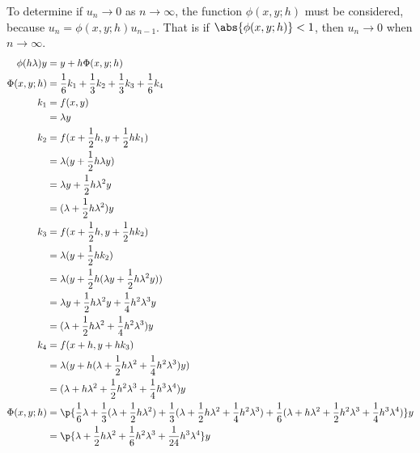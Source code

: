 \documentclass[11pt]{article}
\begin{document}
\begin{enumerate}
\begin{enumerate}
                To determine if $u_n \to 0$ as $n \to \infty$, the function $\phi(x,y;h)$
                must be considered, because $u_n = \phi(x,y;h) u_{n-1}$.
                That is if $\abs{\phi(x,y;h)} < 1$, then $u_n \to 0$ when
                $n \to \infty$.
                \begin{align*}
                    \phi(h\lambda)y &= y + h\Phi(x,y;h) \\
                    \Phi(x,y;h) &= \frac{1}{6} k_1 + \frac{1}{3}k_2 + \frac{1}{3}k_3 + \frac{1}{6}k_4 \\
                    k_1 &= f(x,y) \\
                        &= \lambda y \\
                    k_2 &= f(x + \frac{1}{2}h, y + \frac{1}{2}h k_1) \\
                        &= \lambda(y + \frac{1}{2}h \lambda y) \\
                        &= \lambda y + \frac{1}{2} h \lambda^2 y \\
                        &= (\lambda + \frac{1}{2} h \lambda^2) y \\
                    k_3 &= f(x + \frac{1}{2}h, y + \frac{1}{2} h k_2) \\
                        &= \lambda(y + \frac{1}{2} h k_2) \\
                        &= \lambda(y + \frac{1}{2} h (\lambda y + \frac{1}{2} h \lambda^2 y)) \\
                        &= \lambda y + \frac{1}{2} h \lambda^2 y + \frac{1}{4} h^2 \lambda^3 y \\
                        &= (\lambda + \frac{1}{2} h \lambda^2 + \frac{1}{4} h^2 \lambda^3) y \\
                    k_4 &= f(x + h, y + h k_3) \\
                        &= \lambda(y + h (\lambda + \frac{1}{2} h \lambda^2 + \frac{1}{4} h^2 \lambda^3) y) \\
                        &= (\lambda + h \lambda^2 + \frac{1}{2} h^2 \lambda^3 + \frac{1}{4} h^3 \lambda^4) y \\
                    \Phi(x,y;h) &= \p{\frac{1}{6} \lambda + \frac{1}{3}(\lambda + \frac{1}{2} h \lambda^2) +
                        \frac{1}{3}(\lambda + \frac{1}{2} h \lambda^2 + \frac{1}{4} h^2 \lambda^3) + 
                        \frac{1}{6}(\lambda + h \lambda^2 + \frac{1}{2} h^2 \lambda^3 + \frac{1}{4} h^3 \lambda^4)} y \\
                        &= \p{\lambda + \frac{1}{2} h \lambda^2 + \frac{1}{6} h^2 \lambda^3 + \frac{1}{24} h^3 \lambda^4} y \\

\end{align*}
\end{enumerate}
\end{enumerate}
\end{document}
